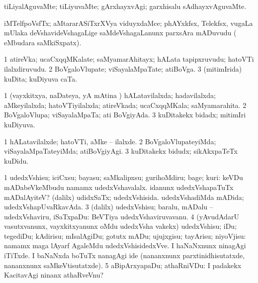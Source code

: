 \bentry
{}
\gl{\kirxvi}
\bmng
tiLiyalAguvaMte; tiLiyuvaMte; gArxhayxvAgi; garxhisalu sAdhayxvAguvaMte. 
\emng
\eentry

\bentry
{}
\gl{\nA}
\bmng
iMTelfpoVsfTx; aMtararASiTxrXVya viduyxdaMce; phAYxkfsx, Telekfsx, \mo vugaLa mUlaka deVshavideVshagaLige saMdeVshagaLanunx parxsAra mADuvudu ( eMbudara saMkiSxpatx). 
\emng
\eentry

\bentry
{}
\gl{\nA}
\bmng
\bnum
\num{1} atireVka; ucaCxqqMKalate; saMyamarAhitayx; hALata tapipxruvudu; hatoVTi ilalxdiruvudu. 
\num{2} BoVgaloVlupate; viSayalaMpaTate; atiBoVga. 
\num{3} (mitimIrida) kuDita; kuDiyuva caTa. 
\enum
\emng
\eentry

\bentry
{}
\gl{\gu}
\bmng
\bnum
\num{1} (vayxkitxya, naDateya, yA mAtina \vi) hALatavilalxda; hadavilalxda; aMkeyilalxda; hatoVTiyilalxda; atireVkada; ucaCxqqMKala; saMyamarahita. 
\num{2} BoVgaloVlupa; viSayalaMpaTa; ati BoVgiyAda. 
\num{3} kuDitakekx bidadx; mitimIri kuDiyuva. 
\enum
\emng
\eentry

\bentry
{}
\gl{\kirxvi}
\bmng
\bnum
\num{1} hALatavilalxde; hatoVTi, aMke -- ilalxde. 
\num{2} BoVgaloVlupateyiMda; viSayalaMpaTateyiMda; atiBoVgiyAgi. 
\num{3} kuDitakekx bidudx; sikAkxpaTeTx kuDidu. 
\enum
\emng
\eentry

\bentry
{}
\gl{\sakirx}
\bmng
\bnum
\num{1} udedxVshisu; iciCxsu; bayasu; saMkalipxsu; gurihoMdiru; bage; kuri:  keVDu mADabeVkeMbudu namamx udedxVshavalalx.  idanunx udedxVshapaTuTx mADalAyiteV? 
 (\BUkaq dalilx) 
\banum
{} udidxSaTx; udedxVshisida. 
 udedxVshadiMda mADida; udedxVshapUvaRkavAda. 
\eanum
\numie
\num{3} (\vakaq dalilx) udedxVshisu; baralu, mADalu -- udedxVshaviru, iSaTxpaDu:  BeVTiya udedxVshaviruvavanu. 
\num{4} (yAvudAdarU vasutxvanunx, vayxkitxyanunx oMdu udedxVsha \mo vakekx) udedxVshisu; iDu; tegediDu; kAdirisu; mIsalAgiDu; gotutx mADu; ujujxgisu; tayArisu; niyoVjisu:  namamx maga lAyarf AgaleMdu udedxVshisidedxVve.  I haNaNxnunx ninagAgi iTiTxde.  I baNaNxda boTuTx nanagAgi ide (nananxnunx parxtinidhisutatxde, nananxnunx saMkeVtisutatxde). 
\num{5} aBipArxyapaDu; athaRniVDu:  I padakekx KacitavAgi ninanx athaRveVnu? 
\enum
\emng
\eentry

